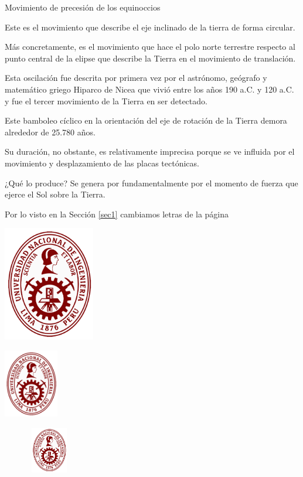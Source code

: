 \documentclass[12pt,a4paper]{article}
\begin{document}
Movimiento de precesión de los equinoccios

Este es el movimiento que describe el eje inclinado de la tierra de forma circular.

Más concretamente, es el movimiento que hace el polo norte terrestre respecto al punto central de la elipse 
que describe la Tierra en el movimiento de translación.

Esta oscilación fue descrita por primera vez por el astrónomo, geógrafo y matemático griego Hiparco de Nicea 
que vivió entre los años 190 a.C. y 120 a.C. y fue el tercer movimiento de la Tierra en ser detectado.

Este bamboleo cíclico en la orientación del eje de rotación de la Tierra demora alrededor de 25.780 años. 

Su duración, no obstante, es relativamente imprecisa porque se ve influida por el movimiento y desplazamiento 
de las placas tectónicas.

¿Qué lo produce? Se genera por fundamentalmente por el momento de fuerza que ejerce el Sol sobre la Tierra.	

Por lo visto en la Sección \ref{sec1} cambiamos letras de la página \pageref{sec1}


\newpage

\includegraphics[width=4cm]{uni}

\includegraphics[height=3cm]{uni}

\includegraphics[width=4cm,height=2cm]{uni}
\end{document}
